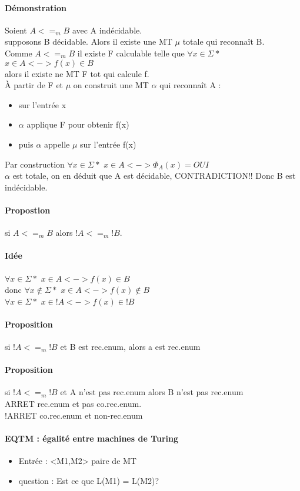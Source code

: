 \documentclass{article}
\begin{document}
{{\paragraph{Démonstration} Soient $A<=_{m}B$ avec A indécidable.\\supposons B décidable. Alors il existe une MT $\mu$ totale qui reconnaît B. \\
Comme $A<=_{m}B$ il existe F calculable telle que  $\forall x \in \Sigma*$  $x \in A <-> f(x) \in B$\\alors il existe ne MT F tot qui calcule f.\\À partir de F et $\mu$ on construit une MT $\alpha$ qui reconnaît A :
\begin{itemize}
\item sur l'entrée x
\item $\alpha$ applique F pour obtenir f(x)
\item puis $\alpha$ appelle $\mu$ sur l'entrée f(x) 
\end{itemize}
Par construction $\forall x \in \Sigma*$ $x \in A <-> \Phi_{A}(x) = OUI$\\ $\alpha$ est totale, on en déduit que A est décidable,  CONTRADICTION!! Donc B est indécidable.

\paragraph{Propostion} si $A<=_{m}B$ alors  $!A<=_{m}!B$. 
\paragraph{Idée} 
$\forall x \in \Sigma*$  $x \in A <-> f(x) \in B$\\donc $\forall x \notin \Sigma*$  $x \in A <-> f(x) \notin B$\\$\forall x \in \Sigma*$  $x \in !A <-> f(x) \in !B$
\paragraph{Proposition} si $!A<=_{m}!B$ et B est rec.enum, alors a est rec.enum
\paragraph{Proposition} si $!A<=_{m}!B$ et A n'est pas rec.enum alors B n'est pas rec.enum\\ARRET rec.enum et pas co.rec.enum.\\!ARRET co.rec.enum et non-rec.enum
\paragraph{EQTM : égalité entre machines de Turing} 
\begin{itemize}
\item Entrée : <M1,M2> paire de MT
\item question : Est ce que L(M1) = L(M2)?
\end{itemize}

}}
\end{document}
